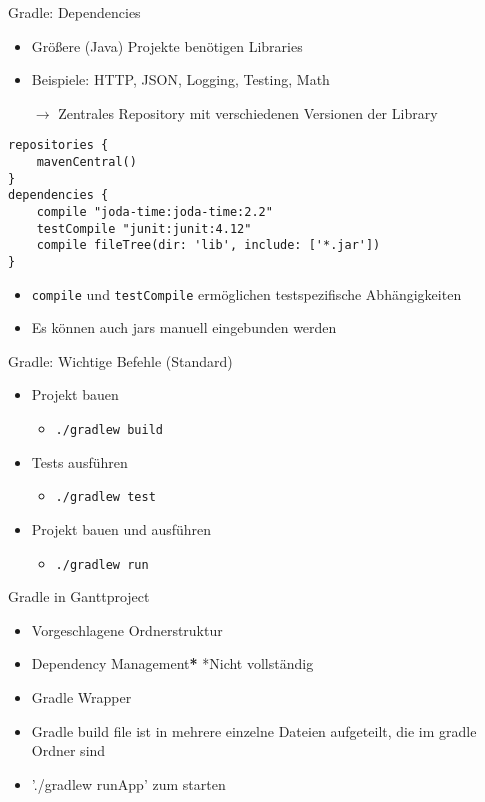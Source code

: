 \documentclass{beamer}
\begin{document}
\begin{frame}[fragile]{Gradle: Dependencies}
	\begin{itemize}
		\item Größere (Java) Projekte benötigen Libraries
		\item Beispiele: HTTP, JSON, Logging, Testing, Math
		\item[$\rightarrow$] Zentrales Repository mit verschiedenen Versionen der Library
	\end{itemize}
\begin{lstlisting}
repositories {
    mavenCentral()
}
dependencies {
    compile "joda-time:joda-time:2.2"
    testCompile "junit:junit:4.12"
    compile fileTree(dir: 'lib', include: ['*.jar'])  
}
\end{lstlisting}
\begin{itemize}
	\item \texttt{compile} und \texttt{testCompile} ermöglichen testspezifische Abhängigkeiten
	\item Es können auch jars manuell eingebunden werden
\end{itemize}
\end{frame}

\begin{frame}{Gradle: Wichtige Befehle (Standard)}
	\begin{itemize}
		\item Projekt bauen
		\begin{itemize}
			\item \texttt{./gradlew build}
		\end{itemize}
		\item Tests ausführen
		\begin{itemize}
			\item \texttt{./gradlew test}
		\end{itemize}
		\item Projekt bauen und ausführen
		\begin{itemize}
			\item \texttt{./gradlew run}
		\end{itemize}
	\end{itemize}
\end{frame}

\begin{frame}{Gradle in Ganttproject}
	\begin{itemize}
		\item Vorgeschlagene Ordnerstruktur
		\item Dependency Management\textbf{*} {\tiny{*Nicht vollständig}}
		\item Gradle Wrapper
		\item Gradle build file ist in mehrere einzelne Dateien aufgeteilt, die im gradle Ordner sind
		\item './gradlew runApp' zum starten
	\end{itemize}
\end{frame}
\end{document}
